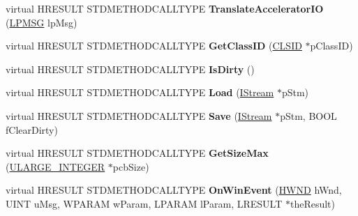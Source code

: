\begin{DoxyCompactItemize}
\item 
\mbox{\label{class_c_explorer_band_a2f8d66211d6bade76729c9076e92b713}} 
virtual H\+R\+E\+S\+U\+LT S\+T\+D\+M\+E\+T\+H\+O\+D\+C\+A\+L\+L\+T\+Y\+PE {\bfseries Translate\+Accelerator\+IO} (\hyperlink{structtag_m_s_g}{L\+P\+M\+SG} lp\+Msg)
\item 
\mbox{\label{class_c_explorer_band_a4dcb339149d2005ab9443c240e6cc8c1}} 
virtual H\+R\+E\+S\+U\+LT S\+T\+D\+M\+E\+T\+H\+O\+D\+C\+A\+L\+L\+T\+Y\+PE {\bfseries Get\+Class\+ID} (\hyperlink{struct___i_i_d}{C\+L\+S\+ID} $\ast$p\+Class\+ID)
\item 
\mbox{\label{class_c_explorer_band_af36272cff875850d627b10388cdb40cd}} 
virtual H\+R\+E\+S\+U\+LT S\+T\+D\+M\+E\+T\+H\+O\+D\+C\+A\+L\+L\+T\+Y\+PE {\bfseries Is\+Dirty} ()
\item 
\mbox{\label{class_c_explorer_band_a9275d5bc3dfd3e650c9718d80c792df2}} 
virtual H\+R\+E\+S\+U\+LT S\+T\+D\+M\+E\+T\+H\+O\+D\+C\+A\+L\+L\+T\+Y\+PE {\bfseries Load} (\hyperlink{interface_i_stream}{I\+Stream} $\ast$p\+Stm)
\item 
\mbox{\label{class_c_explorer_band_a630d6c574d21167525ad5741cd90e1aa}} 
virtual H\+R\+E\+S\+U\+LT S\+T\+D\+M\+E\+T\+H\+O\+D\+C\+A\+L\+L\+T\+Y\+PE {\bfseries Save} (\hyperlink{interface_i_stream}{I\+Stream} $\ast$p\+Stm, B\+O\+OL f\+Clear\+Dirty)
\item 
\mbox{\label{class_c_explorer_band_acd716032c2342346d843fe47dbac3ef1}} 
virtual H\+R\+E\+S\+U\+LT S\+T\+D\+M\+E\+T\+H\+O\+D\+C\+A\+L\+L\+T\+Y\+PE {\bfseries Get\+Size\+Max} (\hyperlink{struct___u_l_a_r_g_e___i_n_t_e_g_e_r}{U\+L\+A\+R\+G\+E\+\_\+\+I\+N\+T\+E\+G\+ER} $\ast$pcb\+Size)
\item 
\mbox{\label{class_c_explorer_band_ab05e881ce453b7707076a13d38887500}} 
virtual H\+R\+E\+S\+U\+LT S\+T\+D\+M\+E\+T\+H\+O\+D\+C\+A\+L\+L\+T\+Y\+PE {\bfseries On\+Win\+Event} (\hyperlink{interfacevoid}{H\+W\+ND} h\+Wnd, U\+I\+NT u\+Msg, W\+P\+A\+R\+AM w\+Param, L\+P\+A\+R\+AM l\+Param, L\+R\+E\+S\+U\+LT $\ast$the\+Result)
\item 
\mbox{\label{class_c_explorer_band_a8f47647237747718d1d88e6de980cf9d}} 

\end{DoxyCompactItemize}
